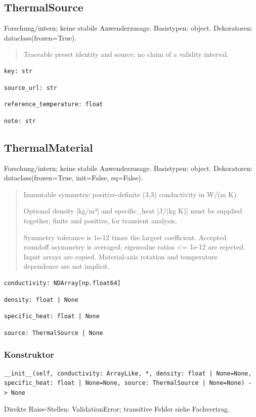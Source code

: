 \subsection{ThermalSource}
Forschung/intern; keine stabile Anwenderzusage.
Basistypen: object. Dekoratoren: dataclass(frozen=True).
\begin{quote}
Traceable preset identity and source; no claim of a validity interval.
\end{quote}
\begin{lstlisting}
key: str
\end{lstlisting}
\begin{lstlisting}
source_url: str
\end{lstlisting}
\begin{lstlisting}
reference_temperature: float
\end{lstlisting}
\begin{lstlisting}
note: str
\end{lstlisting}
\subsection{ThermalMaterial}
Forschung/intern; keine stabile Anwenderzusage.
Basistypen: object. Dekoratoren: dataclass(frozen=True, init=False, eq=False).
\begin{quote}
Immutable symmetric positive-definite (3,3) conductivity in W/(m K).\par Optional density [kg/m³] and specific\_heat [J/(kg K)] must be supplied together, finite and positive, for transient analysis.\par Symmetry tolerance is 1e-12 times the largest coefficient. Accepted roundoff asymmetry is averaged; eigenvalue ratios <= 1e-12 are rejected. Input arrays are copied. Material-axis rotation and temperature dependence are not implicit.
\end{quote}
\begin{lstlisting}
conductivity: NDArray[np.float64]
\end{lstlisting}
\begin{lstlisting}
density: float | None
\end{lstlisting}
\begin{lstlisting}
specific_heat: float | None
\end{lstlisting}
\begin{lstlisting}
source: ThermalSource | None
\end{lstlisting}
\subsubsection*{Konstruktor}
\begin{lstlisting}
__init__(self, conductivity: ArrayLike, *, density: float | None=None, specific_heat: float | None=None, source: ThermalSource | None=None) -> None
\end{lstlisting}
Direkte Raise-Stellen: ValidationError; transitive Fehler siehe Fachvertrag.
